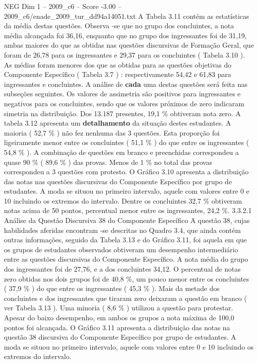\begin{textsample}{NEG Dim 1 – 2009\_c6 – Score -3.00 – 2009\_c6/enade\_2009\_tur\_dd94a14051.txt}
A Tabela 3.11 contém as estatísticas da média destas questões.
Observa -se que no grupo dos concluintes, a nota média alcançada foi 36,16, enquanto que no grupo dos ingressantes foi de 31,19, ambas maiores do que as obtidas nas questões discursivas de Formação Geral, que foram de 26,78 para os ingressantes e 29,37 para os concluintes ( Tabela 3.10 ).
As médias foram menores dos que as obtidas para as questões objetivas do Componente Específico ( Tabela 3.7 ) : respectivamente 54,42 e 61,83 para ingressantes e concluintes.
A análise de \textbf{cada} uma destas questões será feita nas subseções seguintes.
Os valores de assimetria são positivos para ingressantes e negativos para os concluintes, sendo que os valores próximos de zero indicaram simetria na distribuição.
Dos 13.187 presentes, 19,1 \% obtiveram nota zero.
A tabela 3.12 apresenta um \textbf{detalhamento} da situação destes estudantes.
A maioria ( 52,7 \% ) não fez nenhuma das 3 questões.
Esta proporção foi ligeiramente menor entre os concluintes ( 51,1 \% ) do que entre os ingressantes ( 54,8 \% ).
A combinação de questões em branco e preenchidas correspondeu a quase 90 \% ( 89,6 \% ) das provas.
Menos de 1 \% no total das provas correspondeu a 3 questões com protesto.
O Gráfico 3.10 apresenta a distribuição das notas nas questões discursivas do Componente Específico por grupo de estudantes.
A moda se situou no primeiro intervalo, aquele com valores entre 0 e 10 incluindo os extremos do intervalo.
Dentre os concluintes 32,7 \% obtiveram notas acima de 50 pontos, percentual menor entre os ingressantes, 24,2 \%. 3.3.2.1 Análise da Questão Discursiva 38 do Componente Específico A questão 38, cujas habilidades aferidas encontram -se descritas no Quadro 3.4, que ainda contém outras informações, seguido da Tabela 3.13 e do Gráfico 3.11, foi aquela em que os grupos de estudantes observados obtiveram um desempenho intermediário entre as questões discursivas do Componente Específico.
A nota média do grupo dos ingressantes foi de 27,76, e a dos concluintes 34,12.
O percentual de notas zero obtidas nos dois grupos foi de 40,8 \%, um pouco menor entre os concluintes ( 37,9 \% ) do que entre os ingressantes ( 45,3 \% ).
Mais da metade dos concluintes e dos ingressantes que tiraram zero deixaram a questão em branco ( ver Tabela 3.13 ).
Uma minoria ( 8,6 \% ) utilizou a questão para protestar.
Apesar do baixo desempenho, em ambos os grupos a nota máxima de 100,0 pontos foi alcançada.
O Gráfico 3.11 apresenta a distribuição das notas na questão 38 discursiva do Componente Específico por grupo de estudantes.
A moda se situou no primeiro intervalo, aquele com valores entre 0 e 10 incluindo os extremos do intervalo.

\end{textsample}
